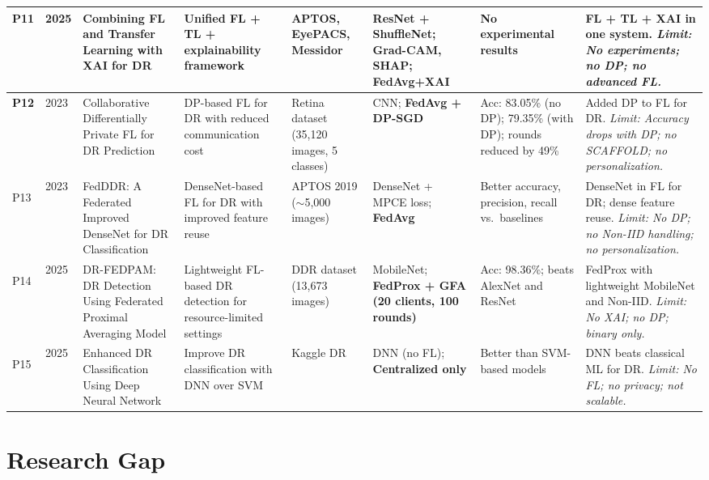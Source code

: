 \documentclass[12pt, a4paper]{article}
\begin{document}
\begin{landscape}
\begin{scriptsize}
\begin{longtable}{|>{\centering\bfseries}p{0.5cm}|p{0.6cm}|p{3.0cm}|p{2.5cm}|p{1.9cm}|p{2.8cm}|p{1.8cm}|p{3.4cm}|}
P11 & 2025 &
Combining FL and Transfer Learning with XAI for DR &
Unified FL + TL + explainability framework &
APTOS, EyePACS, Messidor &
ResNet + ShuffleNet; Grad-CAM, SHAP; \textbf{FedAvg+XAI} &
No experimental results &
FL + TL + XAI in one system. \textit{Limit: No experiments; no DP; no advanced FL.} \\
\hline

P12 & 2023 &
Collaborative Differentially Private FL for DR Prediction &
DP-based FL for DR with reduced communication cost &
Retina dataset (35,120 images, 5 classes) &
CNN; \textbf{FedAvg + DP-SGD} &
Acc: 83.05\% (no DP); 79.35\% (with DP); rounds reduced by 49\% &
Added DP to FL for DR. \textit{Limit: Accuracy drops with DP; no SCAFFOLD; no personalization.} \\
\hline

P13 & 2023 &
FedDDR: A Federated Improved DenseNet for DR Classification &
DenseNet-based FL for DR with improved feature reuse &
APTOS 2019 ($\sim$5,000 images) &
DenseNet + MPCE loss; \textbf{FedAvg} &
Better accuracy, precision, recall vs.\ baselines &
DenseNet in FL for DR; dense feature reuse. \textit{Limit: No DP; no Non-IID handling; no personalization.} \\
\hline

P14 & 2025 &
DR-FEDPAM: DR Detection Using Federated Proximal Averaging Model &
Lightweight FL-based DR detection for resource-limited settings &
DDR dataset (13,673 images) &
MobileNet; \textbf{FedProx + GFA (20 clients, 100 rounds)} &
Acc: 98.36\%; beats AlexNet and ResNet &
FedProx with lightweight MobileNet and Non-IID. \textit{Limit: No XAI; no DP; binary only.} \\
\hline

P15 & 2025 &
Enhanced DR Classification Using Deep Neural Network &
Improve DR classification with DNN over SVM &
Kaggle DR &
DNN (no FL); \textbf{Centralized only} &
Better than SVM-based models &
DNN beats classical ML for DR. \textit{Limit: No FL; no privacy; not scalable.} \\
\hline

\end{longtable}
\end{scriptsize}
\end{landscape}

\section{Research Gap}
\end{document}
